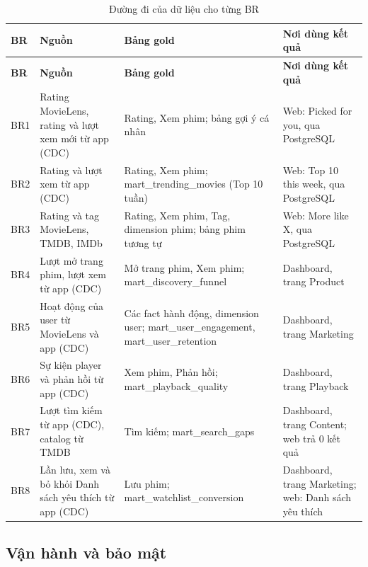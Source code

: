 \documentclass[a4paper,11pt]{article}
\newlength{\reporttablewidth}
\newcommand{\dbsep}{\_\allowbreak}
\begin{document}
\begingroup
\small
{}
\setlength{\tabcolsep}{4pt}
\renewcommand{\arraystretch}{1.18}
\setlength{\reporttablewidth}{\dimexpr\linewidth-6\tabcolsep\relax}
\begin{longtable}{@{}L{0.08\reporttablewidth} L{0.28\reporttablewidth} L{0.39\reporttablewidth} L{0.25\reporttablewidth}@{}}
\caption[Đường đi của dữ liệu cho từng BR (mục 3.6)]{Đường đi của dữ liệu cho từng BR}\label{tab:13} \\
\toprule
\textbf{BR} & \textbf{Nguồn} & \textbf{Bảng gold} & \textbf{Nơi dùng kết quả} \\
\midrule
\endfirsthead
\toprule
\textbf{BR} & \textbf{Nguồn} & \textbf{Bảng gold} & \textbf{Nơi dùng kết quả} \\
\midrule
\endhead
\midrule
\endfoot
\bottomrule
\endlastfoot
BR1 & Rating MovieLens, rating và lượt xem mới từ app (CDC) & Rating, Xem phim; bảng gợi ý cá nhân & Web: \textquotedbl{}Picked for you\textquotedbl{}, qua PostgreSQL \\
BR2 & Rating và lượt xem từ app (CDC) & Rating, Xem phim; mart\dbsep{}trending\dbsep{}movies (Top 10 tuần) & Web: \textquotedbl{}Top 10 this week\textquotedbl{}, qua PostgreSQL \\
BR3 & Rating và tag MovieLens, TMDB, IMDb & Rating, Xem phim, Tag, dimension phim; bảng phim tương tự & Web: \textquotedbl{}More like X\textquotedbl{}, qua PostgreSQL \\
BR4 & Lượt mở trang phim, lượt xem từ app (CDC) & Mở trang phim, Xem phim; mart\dbsep{}discovery\dbsep{}funnel & Dashboard, trang Product \\
BR5 & Hoạt động của user từ MovieLens và app (CDC) & Các fact hành động, dimension user; mart\dbsep{}user\dbsep{}engagement, mart\dbsep{}user\dbsep{}retention & Dashboard, trang Marketing \\
BR6 & Sự kiện player và phản hồi từ app (CDC) & Xem phim, Phản hồi; mart\dbsep{}playback\dbsep{}quality & Dashboard, trang Playback \\
BR7 & Lượt tìm kiếm từ app (CDC), catalog từ TMDB & Tìm kiếm; mart\dbsep{}search\dbsep{}gaps & Dashboard, trang Content; web trả 0 kết quả \\
BR8 & Lần lưu, xem và bỏ khỏi Danh sách yêu thích từ app (CDC) & Lưu phim; mart\dbsep{}watchlist\dbsep{}conversion & Dashboard, trang Marketing; web: Danh sách yêu thích \\
\end{longtable}
\endgroup

\subsection{Vận hành và bảo mật}\label{sec:3.7}
\end{document}
